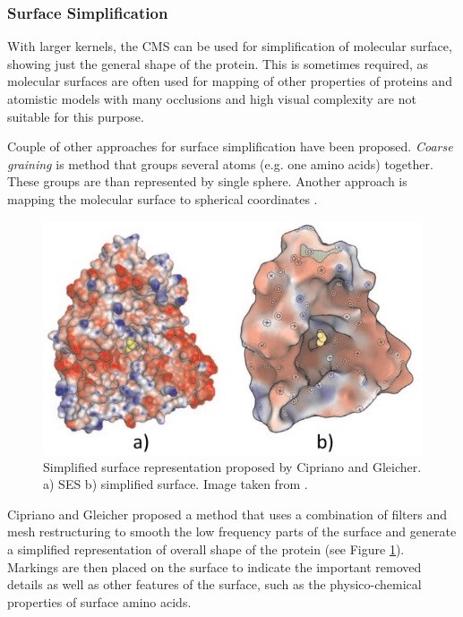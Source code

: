 \subsubsection{Surface Simplification}
With larger kernels, the CMS can be used for simplification of molecular surface, showing just the general shape of the protein. This is sometimes required, as molecular surfaces are often used for mapping of other properties of proteins and atomistic models with many occlusions and high visual complexity are not suitable for this purpose.

Couple of other approaches for surface simplification have been proposed. \textit{Coarse graining} \cite{levitt1976simplified} is method that groups several atoms (e.g. one amino acids) together. These groups are than represented by single sphere. Another approach is mapping the molecular surface to spherical coordinates \cite{postarnakevich2009global}.

\begin{figure} 
\vspace{-10pt}
  \begin{center}
  \includegraphics[width=0.95\linewidth]{pictures/simpl.pdf} 
  \caption{Simplified surface representation proposed by Cipriano and Gleicher. a) SES b) simplified surface. Image taken from \cite{cipriano2007molecular}.}
  \label{Fig:simple}  
	\end{center}
  \vspace{-30pt}
\end{figure}

Cipriano and Gleicher \cite{cipriano2007molecular} proposed a method that uses a combination of
filters and mesh restructuring to smooth the low frequency parts of the surface and generate a simplified representation of overall shape of the protein (see Figure \ref{Fig:simple}). Markings are then placed on the surface to indicate the important removed details as well as other features of the surface, such as the physico-chemical properties of surface amino acids.

